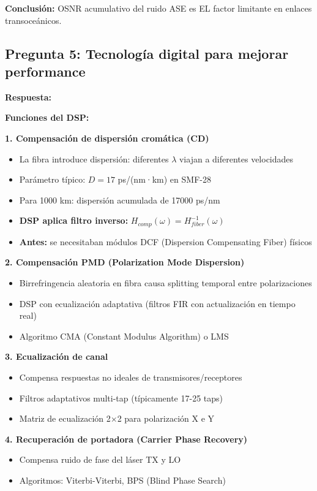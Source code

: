\documentclass[a4paper,10pt]{article}
\begin{document}
\textbf{Conclusión:} OSNR acumulativo del ruido ASE es EL factor limitante en enlaces transoceánicos.

\subsection{Pregunta 5: Tecnología digital para mejorar performance}

\textbf{Respuesta:} 

\textbf{Funciones del DSP:}

\textbf{1. Compensación de dispersión cromática (CD)}
\begin{itemize}
    \item La fibra introduce dispersión: diferentes $\lambda$ viajan a diferentes velocidades
    \item Parámetro típico: $D = 17$ ps/(nm·km) en SMF-28
    \item Para 1000 km: dispersión acumulada de 17000 ps/nm
    \item \textbf{DSP aplica filtro inverso:} $H_{comp}(\omega) = H_{fiber}^{-1}(\omega)$
    \item \textbf{Antes:} se necesitaban módulos DCF (Dispersion Compensating Fiber) físicos
\end{itemize}

\textbf{2. Compensación PMD (Polarization Mode Dispersion)}
\begin{itemize}
    \item Birrefringencia aleatoria en fibra causa splitting temporal entre polarizaciones
    \item DSP con ecualización adaptativa (filtros FIR con actualización en tiempo real)
    \item Algoritmo CMA (Constant Modulus Algorithm) o LMS
\end{itemize}

\textbf{3. Ecualización de canal}
\begin{itemize}
    \item Compensa respuestas no ideales de transmisores/receptores
    \item Filtros adaptativos multi-tap (típicamente 17-25 taps)
    \item Matriz de ecualización 2×2 para polarización X e Y
\end{itemize}

\textbf{4. Recuperación de portadora (Carrier Phase Recovery)}
\begin{itemize}
    \item Compensa ruido de fase del láser TX y LO
    \item Algoritmos: Viterbi-Viterbi, BPS (Blind Phase Search)
\end{itemize}
\end{document}
